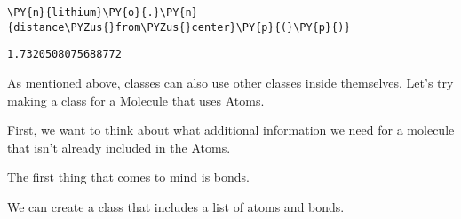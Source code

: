     \begin{tcolorbox}[breakable, size=fbox, boxrule=1pt, pad at break*=1mm,colback=cellbackground, colframe=cellborder]
\begin{Verbatim}[commandchars=\\\{\}]
\PY{n}{lithium}\PY{o}{.}\PY{n}{distance\PYZus{}from\PYZus{}center}\PY{p}{(}\PY{p}{)}
\end{Verbatim}
\end{tcolorbox}

            \begin{tcolorbox}[breakable, size=fbox, boxrule=.5pt, pad at break*=1mm, opacityfill=0]
\begin{Verbatim}[commandchars=\\\{\}]
1.7320508075688772
\end{Verbatim}
\end{tcolorbox}
        
    As mentioned above, classes can also use other classes inside
themselves, Let's try making a class for a Molecule that uses Atoms.

First, we want to think about what additional information we need for a
molecule that isn't already included in the Atoms.

The first thing that comes to mind is bonds.

We can create a class that includes a list of atoms and bonds.


